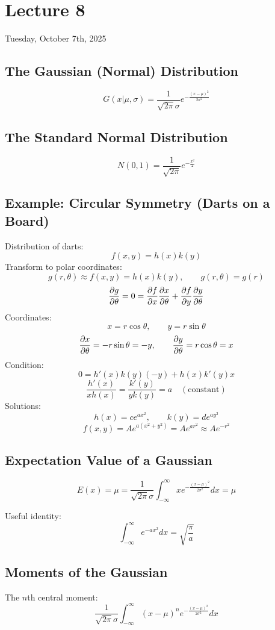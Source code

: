 \section{Lecture 8}
Tuesday, October 7th, 2025

\subsection{The Gaussian (Normal) Distribution}
\[
    G(x|\mu, \sigma) = \frac{1}{\sqrt{2 \pi} \sigma}
    e^{-\frac{(x - \mu)^2}{2 \sigma^2}}
\]

\subsection{The Standard Normal Distribution}
\[
    N(0,1) = \frac{1}{\sqrt{2 \pi}} e^{-\frac{x^2}{2}}
\]

\subsection{Example: Circular Symmetry (Darts on a Board)}
Distribution of darts:
\[
    f(x,y) = h(x) k(y)
\]
Transform to polar coordinates:
\[
    g(r,\theta) \approx f(x,y) = h(x)k(y), \qquad g(r,\theta) = g(r)
\]
\[
    \pdv{g}{\theta} = 0
    = \pdv{f}{x}\pdv{x}{\theta} + \pdv{f}{y}\pdv{y}{\theta}
\]
Coordinates:
\[
    x = r \cos\theta, \qquad y = r \sin\theta
\]
\[
    \pdv{x}{\theta} = -r \sin\theta = -y, \qquad
    \pdv{y}{\theta} = r \cos\theta = x
\]
Condition:
\[
    0 = h'(x) k(y)(-y) + h(x) k'(y) x
\]
\[
    \frac{h'(x)}{x h(x)} = \frac{k'(y)}{y k(y)} = a \quad (\text{constant})
\]
Solutions:
\[
    h(x) = c e^{a x^2}, \qquad k(y) = d e^{a y^2}
\]
\[
    f(x,y) = A e^{a(x^2+y^2)} = A e^{a r^2} \approx A e^{-r^2}
\]

\subsection{Expectation Value of a Gaussian}
\[
    E(x) = \mu = \frac{1}{\sqrt{2 \pi}\sigma}
    \int_{-\infty}^{\infty} x e^{-\frac{(x - \mu)^2}{2\sigma^2}} dx = \mu
\]

Useful identity:
\[
    \int_{-\infty}^{\infty} e^{-a x^2} dx = \sqrt{\frac{\pi}{a}}
\]

\subsection{Moments of the Gaussian}
The $n$th central moment:
\[
    \frac{1}{\sqrt{2 \pi}\sigma} \int_{-\infty}^{\infty} (x-\mu)^n
    e^{-\frac{(x-\mu)^2}{2\sigma^2}} dx
\]

